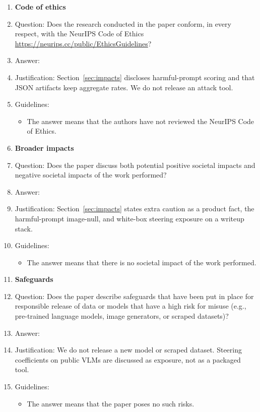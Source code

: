 \begin{enumerate}
\item {\bf Code of ethics}
\item[] Question: Does the research conducted in the paper conform, in every respect, with the NeurIPS Code of Ethics \url{https://neurips.cc/public/EthicsGuidelines}?
\item[] Answer: \answerYes{}
\item[] Justification: Section~\ref{sec:impacts} discloses harmful-prompt scoring and that JSON artifacts keep aggregate rates. We do not release an attack tool.
\item[] Guidelines:
\begin{itemize}
\item The answer \answerNA{} means that the authors have not reviewed the NeurIPS Code of Ethics.
\end{itemize}

\item {\bf Broader impacts}
\item[] Question: Does the paper discuss both potential positive societal impacts and negative societal impacts of the work performed?
\item[] Answer: \answerYes{}
\item[] Justification: Section~\ref{sec:impacts} states extra caution as a product fact, the harmful-prompt image-null, and white-box steering exposure on a writeup stack.
\item[] Guidelines:
\begin{itemize}
\item The answer \answerNA{} means that there is no societal impact of the work performed.
\end{itemize}

\item {\bf Safeguards}
\item[] Question: Does the paper describe safeguards that have been put in place for responsible release of data or models that have a high risk for misuse (e.g., pre-trained language models, image generators, or scraped datasets)?
\item[] Answer: \answerNA{}
\item[] Justification: We do not release a new model or scraped dataset. Steering coefficients on public VLMs are discussed as exposure, not as a packaged tool.
\item[] Guidelines:
\begin{itemize}
\item The answer \answerNA{} means that the paper poses no such risks.
\end{itemize}


\end{enumerate}
